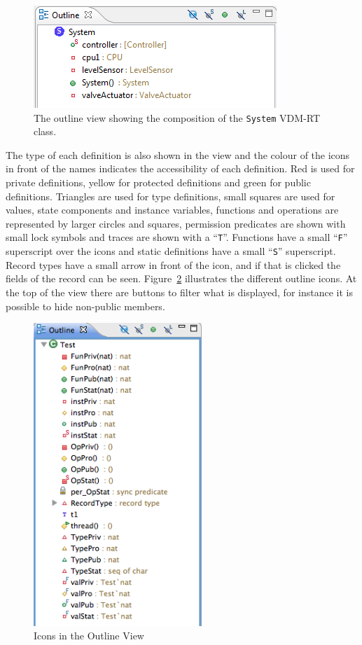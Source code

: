 \documentclass{crescendorepchap}
\begin{document}
\begin{figure}[htbp]
\centering
\includegraphics[width=.6\textwidth]{images/DestecsOutLineViewSystem.png}
\caption{The outline view showing the composition of the \texttt{System}
VDM-RT class.\label{fig:outlineview}}
\end{figure}

The
type of each definition is also shown in the view and the colour of
the icons in front of the names indicates the accessibility of each
definition. Red is
used for private definitions, yellow for protected definitions and
green for public definitions. Triangles are used for
type definitions, small squares are used for values, state components
and instance variables, functions and operations are represented by
larger circles and squares, permission predicates are shown with small
lock symbols and traces are shown with a
``\texttt{T}''. Functions have a small ``\texttt{F}'' superscript over the
icons and static definitions have a small ``\texttt{S}'' superscript.
Record types have a small arrow in front of the
icon, and if that is clicked the fields of the record can be seen.
Figure~\ref{fig:OutlineIcons} illustrates the different outline icons.
At the top of the view there are buttons to filter what is displayed,
for instance it is possible to hide non-public members.

\begin{figure}[!htb]
\begin{center}
  \includegraphics[width=2.5in]{images/OutlineIcons}
  \caption[labelInTOC]{Icons in the Outline View}
  \label{fig:OutlineIcons}
\end{center}
\end{figure}
\end{document}
